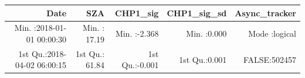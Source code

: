 \documentclass[
  10pt,
  a4paper,oneside]{article}
\begin{document}
\begin{longtable}[]{@{}rrrrr@{}}
\toprule
\begin{minipage}[b]{0.27\columnwidth}\raggedleft
Date\strut
\end{minipage} & \begin{minipage}[b]{0.15\columnwidth}\raggedleft
SZA\strut
\end{minipage} & \begin{minipage}[b]{0.15\columnwidth}\raggedleft
CHP1\_sig\strut
\end{minipage} & \begin{minipage}[b]{0.14\columnwidth}\raggedleft
CHP1\_sig\_sd\strut
\end{minipage} & \begin{minipage}[b]{0.14\columnwidth}\raggedleft
Async\_tracker\strut
\end{minipage}\tabularnewline
\midrule
\endhead
\begin{minipage}[t]{0.27\columnwidth}\raggedleft
Min. :2018-01-01 00:00:30\strut
\end{minipage} & \begin{minipage}[t]{0.15\columnwidth}\raggedleft
Min. : 17.19\strut
\end{minipage} & \begin{minipage}[t]{0.15\columnwidth}\raggedleft
Min. :-2.368\strut
\end{minipage} & \begin{minipage}[t]{0.14\columnwidth}\raggedleft
Min. :0.000\strut
\end{minipage} & \begin{minipage}[t]{0.14\columnwidth}\raggedleft
Mode :logical\strut
\end{minipage}\tabularnewline
\begin{minipage}[t]{0.27\columnwidth}\raggedleft
1st Qu.:2018-04-02 06:00:15\strut
\end{minipage} & \begin{minipage}[t]{0.15\columnwidth}\raggedleft
1st Qu.: 61.84\strut
\end{minipage} & \begin{minipage}[t]{0.15\columnwidth}\raggedleft
1st Qu.:-0.001\strut
\end{minipage} & \begin{minipage}[t]{0.14\columnwidth}\raggedleft
1st Qu.:0.001\strut
\end{minipage} & \begin{minipage}[t]{0.14\columnwidth}\raggedleft
FALSE:502457\strut
\end{minipage}\tabularnewline

\end{longtable}
\end{document}
